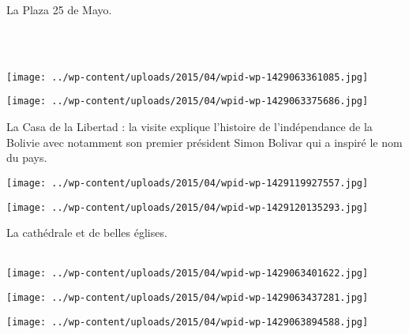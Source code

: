 \pagebreak
 La Plaza 25 de Mayo.
 
 ~\\~\\
 \vspace{0.5mm}
\begin{center} \texttt{[image: ../wp-content/uploads/2015/04/wpid-wp-1429063361085.jpg]} \end{center}
\begin{center} \texttt{[image: ../wp-content/uploads/2015/04/wpid-wp-1429063375686.jpg]} \end{center}
\vspace{-\topsep}
\vspace{-1.75mm}

\pagebreak
 La Casa de la Libertad : la visite explique l'histoire de l'indépendance de la Bolivie avec notamment son premier président Simon Bolivar qui a inspiré le nom du pays. 
\begin{center} \texttt{[image: ../wp-content/uploads/2015/04/wpid-wp-1429119927557.jpg]} \end{center}
\begin{center} \texttt{[image: ../wp-content/uploads/2015/04/wpid-wp-1429120135293.jpg]} \end{center}
\vspace{-\topsep}
\vspace{-2.25mm}

\pagebreak
 La cathédrale et de belles églises.\\~\\
 \vspace{0.5mm}
\begin{center} \texttt{[image: ../wp-content/uploads/2015/04/wpid-wp-1429063401622.jpg]} \end{center}
\begin{center} \texttt{[image: ../wp-content/uploads/2015/04/wpid-wp-1429063437281.jpg]} \end{center}
\begin{center} \texttt{[image: ../wp-content/uploads/2015/04/wpid-wp-1429063894588.jpg]} \end{center}

